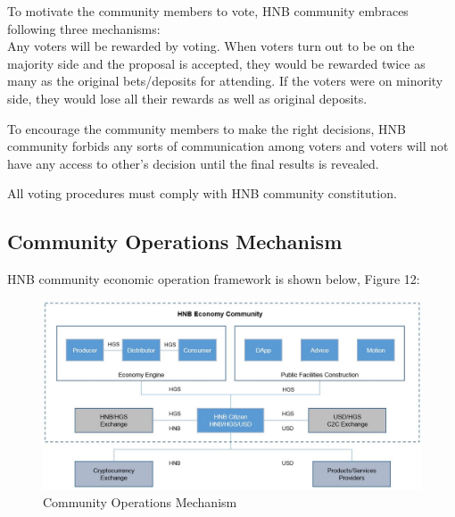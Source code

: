 \documentclass[fleqn,10pt]{SelfArx} %
\begin{document}
To motivate the community members to vote, HNB community embraces following three mechanisms:\\

Any voters will be rewarded by voting. When voters turn out to be on the majority side and the proposal is accepted, they would be rewarded twice as many as the original bets/deposits for attending. If the voters were on minority side, they would lose all their rewards as well as original deposits.

To encourage the community members to make the right decisions, HNB community forbids any sorts of communication among voters and voters will not have any access to other’s decision until the final results is revealed. 

All voting procedures must comply with HNB community constitution.


\subsection{Community Operations Mechanism}

HNB community economic operation framework is shown below, Figure 12: \\

\begin{figure}[ht]\centering %
\includegraphics[width=\linewidth]{12}
\caption{Community Operations Mechanism}
\label{fig:12}
\end{figure}


\end{document}
